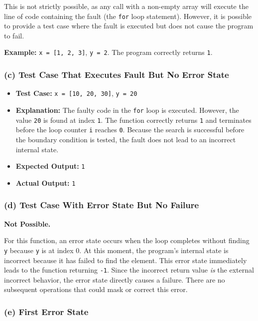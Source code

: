 \documentclass[11pt,a4paper]{article}
\begin{document}
This is not strictly possible, as any call with a non-empty array will execute the line of code containing the fault (the \texttt{for} loop statement). However, it is possible to provide a test case where the fault is executed but does not cause the program to fail.

\textbf{Example:} \texttt{x = [1, 2, 3]}, \texttt{y = 2}. The program correctly returns \texttt{1}.

\subsubsection{(c) Test Case That Executes Fault But No Error State}

\begin{itemize}[leftmargin=*]
    \item \textbf{Test Case:} \texttt{x = [10, 20, 30]}, \texttt{y = 20}
    \item \textbf{Explanation:} The faulty code in the \texttt{for} loop is executed. However, the value \texttt{20} is found at index \texttt{1}. The function correctly returns \texttt{1} and terminates before the loop counter \texttt{i} reaches \texttt{0}. Because the search is successful before the boundary condition is tested, the fault does not lead to an incorrect internal state.
    \item \textbf{Expected Output:} \texttt{1}
    \item \textbf{Actual Output:} \texttt{1}
\end{itemize}

\subsubsection{(d) Test Case With Error State But No Failure}

\textbf{Not Possible.}

 For this function, an error state occurs when the loop completes without finding \texttt{y} because \texttt{y} is at index 0. At this moment, the program's internal state is incorrect because it has failed to find the element. This error state immediately leads to the function returning \texttt{-1}. Since the incorrect return value \textit{is} the external incorrect behavior, the error state directly causes a failure. There are no subsequent operations that could mask or correct this error.

\subsubsection{(e) First Error State}
\end{document}
